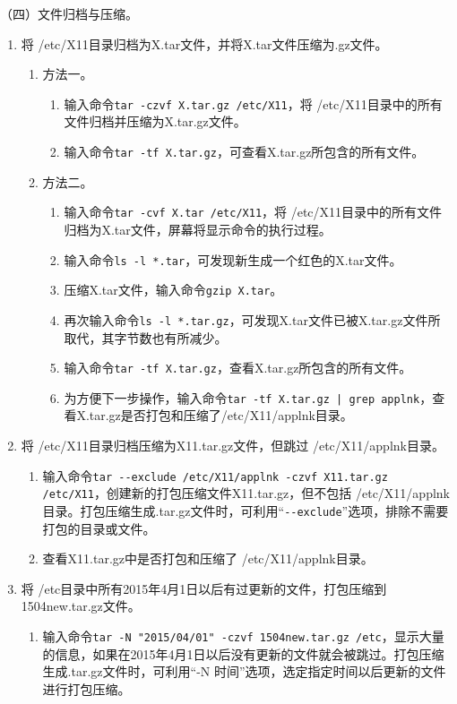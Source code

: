 \vspace{0.1in}
（四）文件归档与压缩。
\begin{enumerate}
  \item 将 /etc/X11目录归档为X.tar文件，并将X.tar文件压缩为.gz文件。
    \begin{enumerate}
      \item 方法一。
	\begin{enumerate}
	  \item 输入命令\verb|tar -czvf X.tar.gz /etc/X11|，将 /etc/X11目录中的所有文件归档并压缩为X.tar.gz文件。
	  \item 输入命令\verb|tar -tf X.tar.gz|，可查看X.tar.gz所包含的所有文件。
	\end{enumerate}
      \item 方法二。
	\begin{enumerate}
	  \item 输入命令\verb|tar -cvf X.tar /etc/X11|，将 /etc/X11目录中的所有文件归档为X.tar文件，屏幕将显示命令的执行过程。
	  \item 输入命令\verb|ls -l *.tar|，可发现新生成一个红色的X.tar文件。
	  \item 压缩X.tar文件，输入命令\verb|gzip X.tar|。
	  \item 再次输入命令\verb|ls -l *.tar.gz|，可发现X.tar文件已被X.tar.gz文件所取代，其字节数也有所减少。
	  \item 输入命令\verb|tar -tf X.tar.gz|，查看X.tar.gz所包含的所有文件。
	  \item 为方便下一步操作，输入命令\verb=tar -tf X.tar.gz | grep applnk=，查看X.tar.gz是否打包和压缩了/etc/X11/applnk目录。
	\end{enumerate}
    \end{enumerate}
  \item 将 /etc/X11目录归档压缩为X11.tar.gz文件，但跳过 /etc/X11/applnk目录。
    \begin{enumerate}
      \item 输入命令\verb|tar --exclude /etc/X11/applnk -czvf X11.tar.gz /etc/X11|，创建新的打包压缩文件X11.tar.gz，但不包括 /etc/X11/applnk目录。打包压缩生成.tar.gz文件时，可利用“\verb|--exclude|”选项，排除不需要打包的目录或文件。
      \item 查看X11.tar.gz中是否打包和压缩了 /etc/X11/applnk目录。
    \end{enumerate}
  \item 将 /etc目录中所有2015年4月1日以后有过更新的文件，打包压缩到1504new.tar.gz文件。
    \begin{enumerate}
      \item 输入命令\verb|tar -N "2015/04/01" -czvf 1504new.tar.gz /etc|，显示大量的信息，如果在2015年4月1日以后没有更新的文件就会被跳过。打包压缩生成.tar.gz文件时，可利用“-N 时间”选项，选定指定时间以后更新的文件进行打包压缩。

\end{enumerate}
\end{enumerate}
